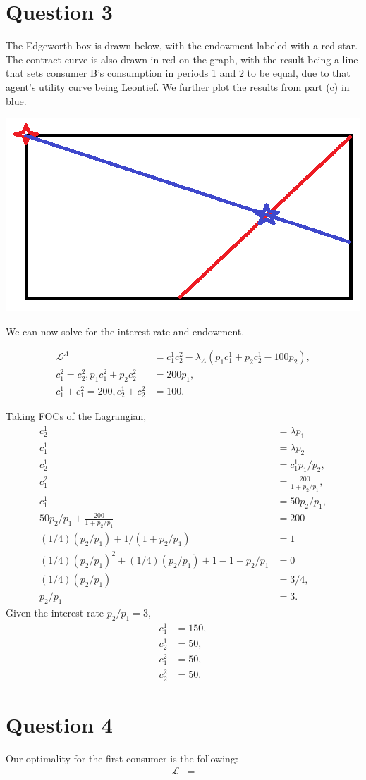 \documentclass[11pt]{article} %
\begin{document}
\section{Question 3}
The Edgeworth box is drawn below, with the endowment labeled with a red star. The contract curve is also drawn in red on the graph, with the result being a line that sets consumer B's consumption in periods 1 and 2 to be equal, due to that agent's utility curve being Leontief. We further plot the results from part (c) in blue.

\includegraphics{edgeworth}

We can now solve for the interest rate and endowment.

\begin{align*}
\mathcal{L}^A &= c_1^1c_2^2 - \lambda_A (p_1c_1^1 + p_2c_2^1 - 100p_2),\\
c_1^2 = c_2^2, p_1c_1^2+p_2c_2^2 &= 200p_1,\\
c_1^1 + c_1^2 = 200, c_2^1 + c_2^2 &= 100.
\end{align*} 

Taking FOCs of the Lagrangian,
\begin{align*}
c_2^1 &= \lambda p_1 \\
c_1^1 &= \lambda p_2\\
c_2^1 &= c_1^1 p_1/p_2,\\
c_1^2 &= \frac{200}{1+p_2/p_1}, \\
c_1^1 &= 50 p_2/p_1,\\
50p_2/p_1 + \frac{200}{1+p_2/p_1} &= 200\\
(1/4)(p_2/p_1) + 1/(1+p_2/p_1) &= 1\\
(1/4)(p_2/p_1)^2 + (1/4)(p_2/p_1) +1 - 1 - p_2/p_1 &= 0  \\
(1/4)(p_2/p_1) &= 3/4,\\
p_2/p_1 &= 3.
\end{align*}
Given the interest rate $p_2/p_1 = 3,$
\begin{align*}
c_1^1 &= 150,\\
c_2^1 &= 50, \\
c_1^2 &= 50, \\
c_2^2 &= 50.
\end{align*}

\section{Question 4}
Our optimality for the first consumer is the following:
\begin{align*}
\mathcal{L} &=
\end{align*}
\end{document}
